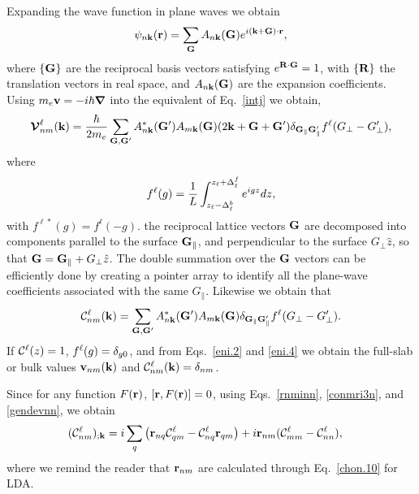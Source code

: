\documentclass[floatfix,prb,aps,superscriptaddress,11pt,preprint,letterpaper]{revtex4}
\begin{document}
Expanding the wave function in plane waves we obtain
\begin{align}\label{eni.1}
\psi_{n\mathbf{k}}(\mathbf{r})=\sum_{\mathbf{G}} A_{n\mathbf{k}}(\mathbf{G})e^{i(\mathbf{k}+\mathbf{G})\cdot\mathbf{r}}
,
\end{align}
where $\{\mathbf{G}\}$ are the reciprocal basis vectors satisfying
$e^{\mathbf{R}\cdot\mathbf{G}}=1$, with $\{\mathbf{R}\}$ the translation vectors in real
space, and $A_{n\mathbf{k}}(\mathbf{G})$ are the expansion coefficients. Using
$m_e\mathbf{v}=-i\hbar\boldsymbol{\nabla}$ into the equivalent of Eq.~\eqref{intj}
 we obtain,\cite{mendozaPRB06}
\begin{align}\label{eni.2}
\boldsymbol{\mathcal{\cal V}}^\ell_{nm}(\mathbf{k})=
\frac{\hbar}{2m_e}
\sum_{\mathbf{G},\mathbf{G}'} A^*_{n\mathbf{k}}(\mathbf{G}')  A_{m\mathbf{k}}(\mathbf{G})
(2\mathbf{k}+\mathbf{G}+\mathbf{G}')
\delta_{\mathbf{G}_\parallel \mathbf{G}'_\parallel}  
f^\ell(G_\perp-G'_\perp)
,
\end{align}   
where
\begin{align}\label{vnl.9}
f^\ell(g)=\frac{1}{L}\int_{z_\ell-\Delta^b_\ell}^{z_\ell+\Delta^f_\ell} e^{igz}dz  
 ,
\end{align}
with $f^{\ell*}(g)=f^\ell(-g)$. 
the reciprocal lattice vectors $\mathbf{G}$ are decomposed into components
parallel to the surface $\mathbf{G}_\parallel$, and perpendicular to the
surface $G_\perp \hat z$, so
that $\mathbf{G} = \mathbf{G}_\parallel + G_\perp\hat z$.
The double summation over the $\mathbf{G}$ vectors can be efficiently done by  
creating a pointer array to identify all the plane-wave coefficients  
associated with the same $G_\parallel$.  
 Likewise we obtain that
\begin{align}\label{eni.4}
{\mathbf{\cal C}}^\ell_{nm}(\mathbf{k})=
\sum_{\mathbf{G},\mathbf{G}'} A^*_{n\mathbf{k}}(\mathbf{G}')  A_{m\mathbf{k}}(\mathbf{G})
\delta_{\mathbf{G}_\parallel \mathbf{G}'_\parallel} 
f^\ell(G_\perp-G'_\perp)
.
\end{align}  
If ${\mathbf{\cal C}}^\ell(z)=1$, $f^\ell(g)=\delta_{g0}$, and from Eqs.~\eqref{eni.2} and \eqref{eni.4}
we obtain the full-slab or bulk values
$\mathbf{v}_{nm}(\mathbf{k})$ and
${\mathbf{\cal C}}^\ell_{nm}(\mathbf{k})=\delta_{nm}$.

Since for any function $F(\mathbf{r})$, $[\mathbf{r},F(\mathbf{r})]=0$, using 
Eqs.~\eqref{rnminn}, \eqref{conmri3n}, and \eqref{gendevnn}, we obtain
\begin{align} 
({\mathbf{\cal C}}^\ell_{nm})_{;\mathbf{k}}
&=
i
\sum_{q} 
 \left(\mathbf{r}_{nq}
{\mathbf{\cal C}}^\ell_{qm}
-
{\mathbf{\cal C}}^\ell_{nq}
\mathbf{r}_{qm}
\right) 
+i\mathbf{r}_{nm}({\mathbf{\cal C}}^\ell_{mm}-{\mathbf{\cal C}}^\ell_{nn}) 
,
\end{align} 
where we remind the reader that $\mathbf{r}_{nm}$ are calculated through
Eq.~\eqref{chon.10} for LDA. 

\end{document}
